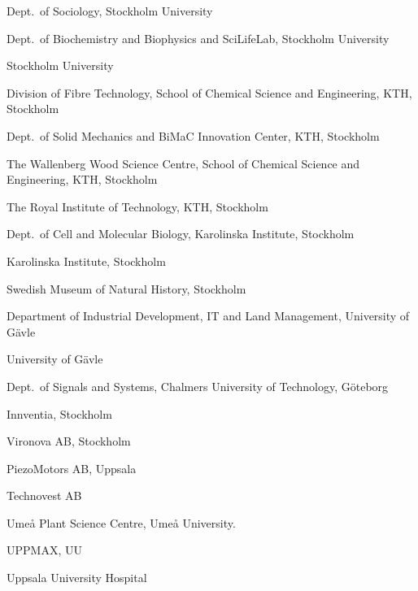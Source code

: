 {\begin{trivlist}
\item Dept.~of Sociology, Stockholm University
\item Dept.~of Biochemistry and Biophysics and SciLifeLab, Stockholm University
\item Stockholm University
\item Division of Fibre Technology, School of Chemical Science and Engineering, KTH, Stockholm
\item Dept.~of Solid Mechanics and BiMaC Innovation Center, KTH, Stockholm
\item The Wallenberg Wood Science Centre, School of Chemical Science and Engineering, KTH, Stockholm
\item The Royal Institute of Technology, KTH, Stockholm
\item Dept.~of Cell and Molecular Biology, Karolinska Institute, Stockholm
\item Karolinska Institute, Stockholm
\item Swedish Museum of Natural History, Stockholm
\item Department of Industrial Development, IT and Land Management, University of G\"{a}vle
\item University of G\"{a}vle
\item Dept.~of Signals and Systems, Chalmers University of Technology, G\"{o}teborg
\item Innventia, Stockholm
\item Vironova AB, Stockholm
\item PiezoMotors AB, Uppsala
\item Technovest AB
\item Ume\r{a} Plant Science Centre, Ume\r{a}  University.
\item UPPMAX, UU
\item Uppsala University Hospital
\end{trivlist}
}
\addtolength\textheight{-1ex}

\newpage

%
